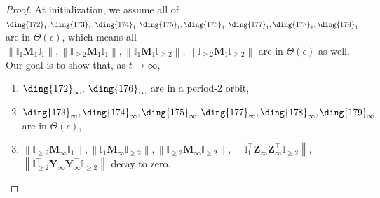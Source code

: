 \documentclass{article}
\theoremstyle{plain}
\theoremstyle{remark}
\newcommand{\norm}[1]{\left\lVert#1\right\rVert}
\def\bY{\mathbf{Y}}
\def\bZ{\mathbf{Z}}
\newcommand{\cc}[1]{\text{\ding{\number\numexpr#1 + 171\relax}}}
\begin{document}
\begin{proof}
    At initialization, we assume all of $\cc{1}_1, \cc{2}_1, \cc{3}_1, \cc{4}_1, \cc{5}_1, \cc{6}_1, \cc{7}_1, \cc{8}_1$ are in $\Theta(\epsilon)$, which means all $\norm{\mathbb{I}_{1}\mathbf{M}_1\mathbb{I}_{1}}, \norm{\mathbb{I}_{\ge2}\mathbf{M}_1\mathbb{I}_{1}}, \norm{\mathbb{I}_{1}\mathbf{M}_1\mathbb{I}_{\ge2}}, \norm{\mathbb{I}_{\ge2}\mathbf{M}_1\mathbb{I}_{\ge2}}$ are in $\Theta(\epsilon)$ as well. Our goal is to show that, as $t\rightarrow \infty$,
    \begin{enumerate}
        \item $\cc{1}_\infty$, $\cc{5}_\infty$ are in a period-2 orbit,
        \item $\cc{2}_\infty, \cc{3}_\infty, \cc{4}_\infty, \cc{6}_\infty, \cc{7}_\infty, \cc{8}_\infty$ are in $\Theta(\epsilon)$,
        \item $\norm{\mathbb{I}_{\ge2}\mathbf{M}_\infty\mathbb{I}_{1}}, \norm{\mathbb{I}_{1}\mathbf{M}_\infty\mathbb{I}_{\ge2}}, \norm{\mathbb{I}_{\ge2}\mathbf{M}_\infty\mathbb{I}_{\ge2}}$, $\norm{\mathbb{I}_{1}^\top\bZ_\infty\bZ_{\infty}^\top\mathbb{I}_{\ge2}}$, $\norm{\mathbb{I}_{\ge2}^\top\bY_\infty\bY_{\infty}^\top\mathbb{I}_{\ge2}}$ decay to zero.
    \end{enumerate}


\end{proof}
\end{document}
